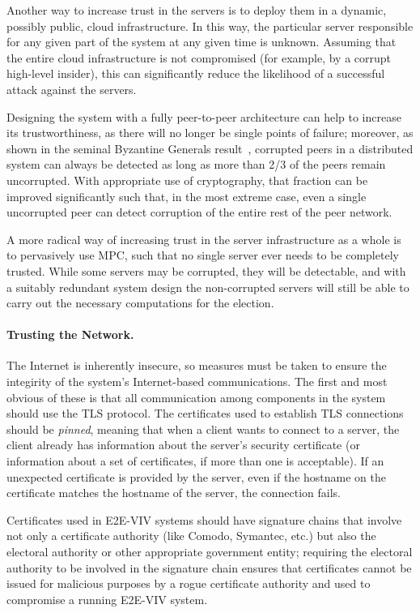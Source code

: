 Another way to increase trust in the servers is to deploy them in a
dynamic, possibly public, cloud infrastructure. In this way, the
particular server responsible for any given part of the system at any
given time is unknown. Assuming that the entire cloud infrastructure
is not compromised (for example, by a corrupt high-level insider),
this can significantly reduce the likelihood of a successful attack
against the servers.

Designing the system with a fully peer-to-peer architecture can help
to increase its trustworthiness, as there will no longer be single
points of failure; moreover, as shown in the seminal Byzantine
Generals result~\cite{Lamport82}, corrupted peers in a distributed
system can always be detected as long as more than 2/3 of the peers
remain uncorrupted. With appropriate use of cryptography, that
fraction can be improved significantly such that, in the most extreme
case, even a single uncorrupted peer can detect corruption of the
entire rest of the peer network.

A more radical way of increasing trust in the server infrastructure as
a whole is to pervasively use MPC, such that no single server ever
needs to be completely trusted. While some servers may be corrupted,
they will be detectable, and with a suitably redundant system design
the non-corrupted servers will still be able to carry out the
necessary computations for the election.

\paragraph{Trusting the Network.} The Internet is inherently insecure,
so measures must be taken to ensure the integirity of the system's
Internet-based communications. The first and most obvious of these is
that all communication among components in the system should use the
TLS protocol. The certificates used to establish TLS connections
should be \emph{pinned}, meaning that when a client wants to connect
to a server, the client already has information about the server's
security certificate (or information about a set of certificates, if
more than one is acceptable). If an unexpected certificate is provided
by the server, even if the hostname on the certificate matches the
hostname of the server, the connection fails.

Certificates used in E2E-VIV systems should have signature chains that
involve not only a certificate authority (like Comodo, Symantec, etc.)
but also the electoral authority or other appropriate government
entity; requiring the electoral authority to be involved in the
signature chain ensures that certificates cannot be issued for
malicious purposes by a rogue certificate authority and used to
compromise a running E2E-VIV system.

